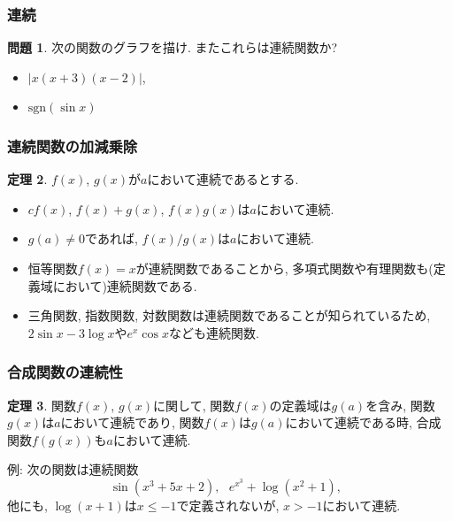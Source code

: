\documentclass[dvipdfmx,cjk,10.2pt]{beamer}
\theoremstyle{definition}
\newtheorem{Thm}{定理}[section]
\newtheorem{Prob}[Thm]{問題}
\begin{document}


\begin{frame}
\frametitle{連続} 



\begin{Prob}
次の関数のグラフを描け. またこれらは連続関数か? 
\begin{itemize}
\item  $|x(x+3)(x-2)|$, 
\item  $\mathrm{sgn}(\sin x)$ 
\end{itemize}
\end{Prob}


\end{frame}




\begin{frame}
\frametitle{連続関数の加減乗除} 


\begin{Thm}
$f(x )$, $g(x)$が$a$において連続であるとする. 
\begin{itemize}
\item $cf(x)$, $f(x)+g(x)$, $f(x)g(x)$は$a$において連続. 
\item $g(a) \neq0$であれば, $f(x)/g(x)$は$a$において連続. 
\end{itemize}
\end{Thm}

\begin{itemize}
\item 恒等関数$f(x)=x$が連続関数であることから, 多項式関数や有理関数も(定義域において)連続関数である.  
\item 三角関数, 指数関数, 対数関数は連続関数であることが知られているため, $2\sin x -3 \log x$や$e^x \cos x$なども連続関数. 
\end{itemize}
\end{frame}




\begin{frame}
\frametitle{合成関数の連続性} 


\begin{Thm}
関数$f(x)$, $g(x)$に関して, 関数$f(x)$の定義域は$g(a)$を含み, 関数$g(x)$は$a$において連続であり, 
関数$f(x)$は$g(a)$において連続である時, 合成関数$f(g(x))$も$a$において連続. 
\end{Thm}

例: 次の関数は連続関数
$$
\sin(x^3+5x+2), \ \ \ e^{x^3}+\log(x^2+1), \ \ \ 
$$
他にも, $\log(x+1)$は$x\le-1$で定義されないが, $x>-1$において連続. 


\end{frame}
\end{document}
